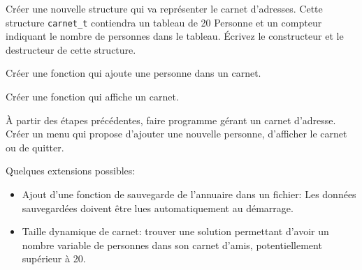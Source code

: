 \documentclass[10pt]{article}\usepackage[correction,nu]{esial}
\begin{document}
\Question Créer une nouvelle structure qui va représenter le carnet
d'adresses.  Cette structure \texttt{carnet\_t} contiendra un tableau
de 20 Personne et un compteur indiquant le nombre de personnes dans le
tableau. Écrivez le constructeur et le destructeur de cette structure.

\Question Créer une fonction qui ajoute une personne dans un carnet.

\Question Créer une fonction qui affiche un carnet.

\Question À partir des étapes précédentes, faire programme gérant un carnet
d'adresse. Créer un menu qui propose d'ajouter une nouvelle personne,
d'afficher le carnet ou de quitter.

\Question Quelques  extensions possibles:
\begin{itemize}
\item Ajout d'une fonction de sauvegarde de l'annuaire dans un
  fichier: Les données sauvegardées doivent être lues automatiquement
  au démarrage.
\item Taille dynamique de carnet: trouver une solution permettant
  d'avoir un nombre variable de personnes dans son carnet d'amis,
  potentiellement supérieur à 20.
\end{itemize}





\end{document}
